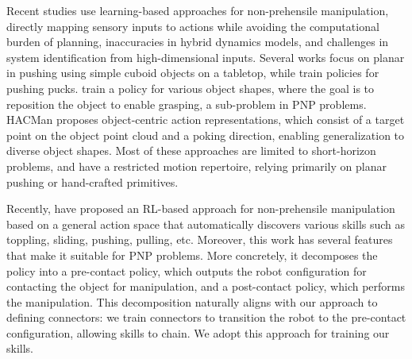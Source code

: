 
Recent studies use learning-based approaches for non-prehensile manipulation, directly mapping sensory inputs to actions while avoiding the computational burden of planning, inaccuracies in hybrid dynamics models, and challenges in system identification from high-dimensional inputs. Several works \cite{ferrandis2023nonprehensile, yuan2018rearrangement, yuan2019end} focus on planar in pushing using simple cuboid objects on a tabletop, while \citet{peng2018sim} train policies for pushing pucks. \citet{zhou2023learning} train a policy for various object shapes, where the goal is to reposition the object to enable grasping, a sub-problem in PNP problems. HACMan \cite{zhou2023hacman} proposes object-centric action representations, which consist of a target point on the object point cloud and a poking direction, enabling generalization to diverse object shapes. Most of these approaches are limited to short-horizon problems, and have a restricted motion repertoire, relying primarily on planar pushing or hand-crafted primitives.

Recently, \citet{kim2023pre} have proposed an RL-based approach for non-prehensile manipulation based on a general action space that automatically discovers various skills such as toppling, sliding, pushing, pulling, etc. Moreover, this work has several features that make it suitable for PNP problems. More concretely, it decomposes the policy into a pre-contact policy, which outputs the robot configuration for contacting the object for manipulation, and a post-contact policy, which performs the manipulation. This decomposition naturally aligns with our approach to defining connectors: we train connectors to transition the robot to the pre-contact configuration, allowing skills to chain. We adopt this approach for training our skills.



